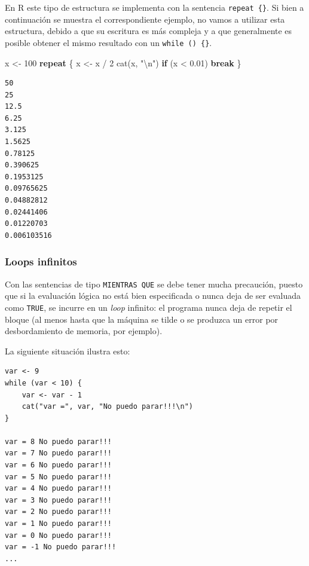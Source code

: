 \documentclass[
]{book}
\newenvironment{Shaded}{\begin{snugshade}}{\end{snugshade}}
\newcommand{\ControlFlowTok}[1]{\textcolor[rgb]{0.13,0.29,0.53}{\textbf{#1}}}
\newcommand{\DecValTok}[1]{\textcolor[rgb]{0.00,0.00,0.81}{#1}}
\newcommand{\FloatTok}[1]{\textcolor[rgb]{0.00,0.00,0.81}{#1}}
\newcommand{\FunctionTok}[1]{\textcolor[rgb]{0.00,0.00,0.00}{#1}}
\newcommand{\NormalTok}[1]{#1}
\newcommand{\OtherTok}[1]{\textcolor[rgb]{0.56,0.35,0.01}{#1}}
\newcommand{\SpecialCharTok}[1]{\textcolor[rgb]{0.00,0.00,0.00}{#1}}
\newcommand{\StringTok}[1]{\textcolor[rgb]{0.31,0.60,0.02}{#1}}
\begin{document}
En R este tipo de estructura se implementa con la sentencia \texttt{repeat\ \{\}}. Si bien a continuación se muestra el correspondiente ejemplo, no vamos a utilizar esta estructura, debido a que su escritura es más compleja y a que generalmente es posible obtener el mismo resultado con un \texttt{while\ ()\ \{\}}.

\begin{Shaded}
\begin{Highlighting}[]
\NormalTok{x }\OtherTok{\textless{}{-}} \DecValTok{100}
\ControlFlowTok{repeat}\NormalTok{ \{}
\NormalTok{    x }\OtherTok{\textless{}{-}}\NormalTok{ x }\SpecialCharTok{/} \DecValTok{2}
    \FunctionTok{cat}\NormalTok{(x, }\StringTok{"}\SpecialCharTok{\textbackslash{}n}\StringTok{"}\NormalTok{)}
    \ControlFlowTok{if}\NormalTok{ (x }\SpecialCharTok{\textless{}} \FloatTok{0.01}\NormalTok{) }\ControlFlowTok{break}
\NormalTok{\}}
\end{Highlighting}
\end{Shaded}

\begin{verbatim}
50 
25 
12.5 
6.25 
3.125 
1.5625 
0.78125 
0.390625 
0.1953125 
0.09765625 
0.04882812 
0.02441406 
0.01220703 
0.006103516 
\end{verbatim}

\hypertarget{loops-infinitos}{%
\subsubsection{Loops infinitos}\label{loops-infinitos}}

Con las sentencias de tipo \texttt{MIENTRAS\ QUE} se debe tener mucha precaución, puesto que si la evaluación lógica no está bien especificada o nunca deja de ser evaluada como \texttt{TRUE}, se incurre en un \emph{loop} infinito: el programa nunca deja de repetir el bloque (al menos hasta que la máquina se tilde o se produzca un error por desbordamiento de memoria, por ejemplo).

La siguiente situación ilustra esto:

\begin{verbatim}
var <- 9
while (var < 10) {
    var <- var - 1
    cat("var =", var, "No puedo parar!!!\n")
}

var = 8 No puedo parar!!!
var = 7 No puedo parar!!!
var = 6 No puedo parar!!!
var = 5 No puedo parar!!!
var = 4 No puedo parar!!!
var = 3 No puedo parar!!!
var = 2 No puedo parar!!!
var = 1 No puedo parar!!!
var = 0 No puedo parar!!!
var = -1 No puedo parar!!!
...
\end{verbatim}
\end{document}

